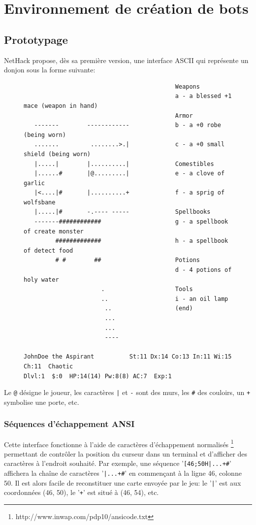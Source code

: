 \documentclass[a4paper,12pt]{article}
\begin{document}
\section{Environnement de création de bots}

\subsection{Prototypage}

NetHack propose, dès sa première version, une interface ASCII qui représente
un donjon sous la forme suivante:

\begin{figure}[H]
\begin{verbatim}
                                           Weapons
                                           a - a blessed +1 mace (weapon in hand)
                                           Armor
   -------        ------------             b - a +0 robe (being worn)
   .......         ........>.|             c - a +0 small shield (being worn)
   |.....|        |..........|             Comestibles
   |......#       |@.........|             e - a clove of garlic
   |<....|#       |..........+             f - a sprig of wolfsbane
   |.....|#       -.---- -----             Spellbooks
   -------############                     g - a spellbook of create monster
         #############                     h - a spellbook of detect food
         # #        ##                     Potions
                                           d - 4 potions of holy water
                      .                    Tools
                      ..                   i - an oil lamp
                       ..                  (end) 
                       ...
                       ...
                       ----

JohnDoe the Aspirant          St:11 Dx:14 Co:13 In:11 Wi:15 Ch:11  Chaotic
Dlvl:1  $:0  HP:14(14) Pw:8(8) AC:7  Exp:1
\end{verbatim}
\end{figure}

Le \verb!@! désigne le joueur, les caractères \verb!|! et \verb!-! sont des
murs, les \verb!#! des couloirs, un \verb!+! symbolise une porte, etc.


\subsubsection*{Séquences d'échappement ANSI}

Cette interface fonctionne à l'aide de caractères d'échappement normalisés
\footnote{http://www.inwap.com/pdp10/ansicode.txt} permettant de contrôler la
position du curseur dans un terminal et d'afficher des caractères à l'endroit
souhaité. Par exemple, une séquence '\verb![46;50H|...+#!' affichera la chaîne
de caractères '\verb!|...+#!' en commençant à la ligne 46, colonne 50. Il est
alors facile de reconstituer une carte envoyée par le jeu: le '\verb!|!' est
aux coordonnées (46, 50), le '\verb!+!' est situé à (46, 54), etc.
	
\end{document}
